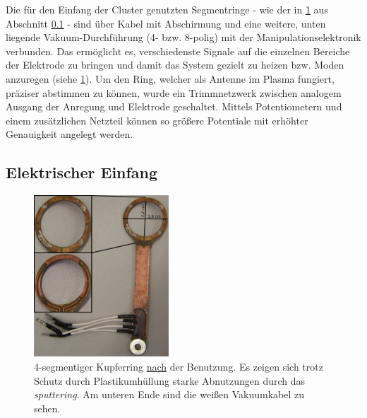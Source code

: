 \documentclass[numbers=noenddot,a4paper]{scrartcl}
\newcommand{\tilt}[1]{\textit{#1}}
\begin{document}
			Die für den Einfang der Cluster genutzten Segmentringe - wie der in \ref{img:ring} aus Abschnitt \ref{sub:einfang} - sind \"uber Kabel mit Abschirmung und eine weitere, unten liegende Vakuum-Durchf\"uhrung (4- bzw. 8-polig) mit der Manipulationselektronik verbunden. Das erm\"oglicht es, verschiedenste Signale auf die einzelnen Bereiche der Elektrode zu bringen und damit das System gezielt zu heizen bzw. Moden anzuregen (siehe \ref{img:ring}). Um den Ring, welcher als Antenne im Plasma fungiert, pr\"aziser abstimmen zu können, wurde ein Trimmnetzwerk zwischen analogem Ausgang der Anregung und Elektrode geschaltet. Mittels Potentiometern und einem zus\"atzlichen Netzteil k\"onnen so gr\"o{\ss}ere Potentiale mit erh\"ohter Genauigkeit angelegt werden.

		\subsection{Elektrischer Einfang} \label{sub:einfang}

				\begin{figure}
					\centering
					\includegraphics[width=0.45\textwidth,height=0.55\textwidth]{figs/cam/ringelektrode.jpg}
					\caption{4-segmentiger Kupferring \underline{nach} der Benutzung. Es zeigen sich trotz Schutz durch Plastikumhüllung starke Abnutzungen durch das \tilt{sputtering}. Am unteren Ende sind die weißen Vakuumkabel zu sehen.}
					\label{img:ring}
				\end{figure}
\end{document}
